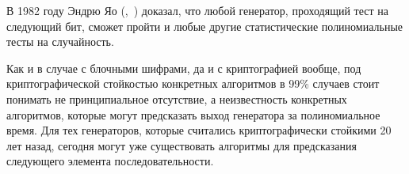 В 1982 году Эндрю Яо (,~\cite{Yao:1982}) доказал, что любой генератор, проходящий тест на следующий бит, сможет пройти и любые другие статистические полиномиальные тесты на случайность.

Как и в случае с блочными шифрами, да и с криптографией вообще, под криптографической стойкостью конкретных алгоритмов в 99\% случаев стоит понимать не принципиальное отсутствие, а неизвестность конкретных алгоритмов, которые могут предсказать выход генератора за полиномиальное время. Для тех генераторов, которые считались криптографически стойкими 20 лет назад, сегодня могут уже существовать алгоритмы для предсказания следующего элемента последовательности.
